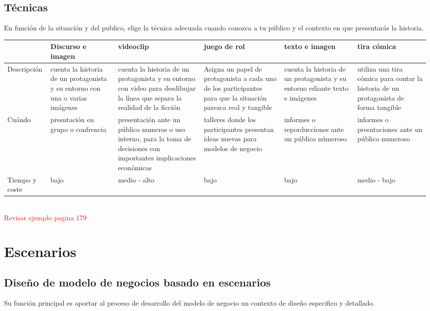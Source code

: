 \documentclass[11pt]{book}
\begin{document}
\section{Técnicas}
En función de la situación y del publico, elige la técnica adecuada cuando conozca a tu público y el contexto en que presentarás la historia.
\begin{table}[htbp]
  \centering
  \begin{turn}{90}
    \begin{tabular}{p{7em}|p{8.5em}p{8.5em}p{8.5em}p{8.5em}l}
    \multicolumn{1}{r}{} & Discurso e imagen & videoclip & juego de rol & texto e imagen & \multicolumn{1}{p{8.5em}}{tira cómica} \\
    \midrule
    Descripción & cuenta la historia de un protagonista y su entorno con una o varias imágenes & cuenta la historia de un protagonista y su entorno con video para desdibujar la línea que separa la realidad de la ficción & Asigna un papel de protagonista a cada uno de los participantes para que la situación parezca real y tangible & cuenta la historia de un protagonista y su entorno ediante texto e imágenes & \multicolumn{1}{p{8.5em}}{utiliza una tira cómica para contar la historia de un protagonista de forma tangible} \\
    Cuándo & presntación en grupo o confrencia  & presentación ante un público numeros o uso interno, para la toma de decisiones con importantes implicaciones económicas & talleres donde los participantes presentan ideas nuevas para modelos de negocio & informes o reporducciones ante un público númeroso & \multicolumn{1}{p{8.5em}}{informes o presntaciones ante un público numeroso} \\
    Tiempo y coste & bajo  & medio - alto & bajo  & bajo  & medio - bajo \\
    \end{tabular}%
  \label{tab:addlabel}%
    \end{turn}
\end{table}%
\\
\textcolor{red}{Revisar ejemplo pagina 179}

\chapter{Escenarios}
\section{Diseño de modelo de negocios basado en escenarios}
Su función principal es aportar al proceso de desarrollo del modelo de negocio un contexto de diseño especifico y detallado.
\end{document}
